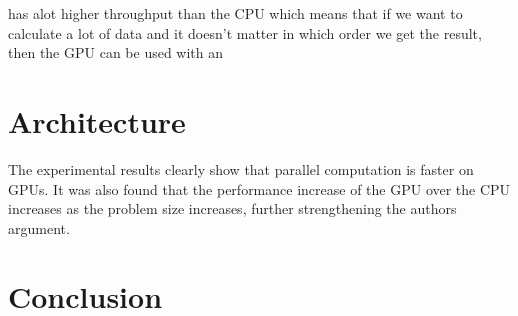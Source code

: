 \documentclass[titlepage, a4paper]{article}
\begin{document}
has alot higher throughput than the CPU which means that if we want to calculate a lot of data and it doesn't matter in which order we get the result, then the GPU can be used with an 

\section{Architecture}\label{sec:arch}
The experimental results clearly show that parallel computation is faster on GPUs. It was also found that the performance increase of the GPU over the CPU increases as the problem size increases, further strengthening the authors argument. 

\section{Conclusion}\label{sec:conclusion}
\end{document}
